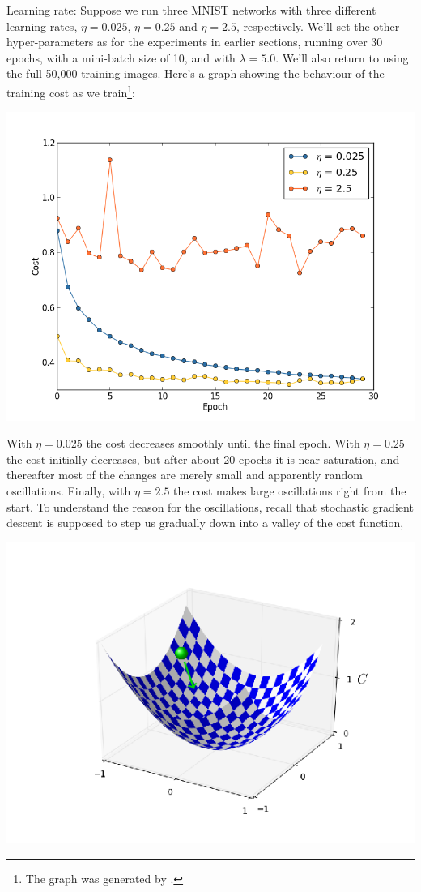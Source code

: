 \documentclass[a4paper,twoside,10pt]{book}
\begin{document}
Learning rate: Suppose we run three MNIST networks with three different learning rates, $\eta=0.025$, $\eta=0.25$ and $\eta=2.5$, respectively. We'll set the other hyper-parameters as for the experiments in earlier sections, running over 30 epochs, with a mini-batch size of 10, and with $\lambda=5.0$. We'll also return to using the full 50,000 training images. Here's a graph showing the behaviour of the training cost as we train\footnote{The graph was generated by .}:
\begin{center}
	\includegraphics[width=0.7\linewidth]{figures/ch3/multiple_eta}
\end{center}
With $\eta=0.025$ the cost decreases smoothly until the final epoch. With $\eta=0.25$ the cost initially decreases, but after about 20 epochs it is near saturation, and thereafter most of the changes are merely small and apparently random oscillations. Finally, with $\eta=2.5$ the cost makes large oscillations right from the start. To understand the reason for the oscillations, recall that stochastic gradient descent is supposed to step us gradually down into a valley of the cost function,
\begin{center}
	\includegraphics[width=0.5\linewidth]{figures/ch3/tikz33}
\end{center}
\end{document}
